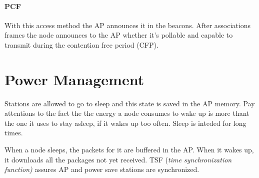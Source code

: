 \paragraph*{PCF} With this access method the AP announces it in the beacons.
After associations frames the node announces to the AP whether it's pollable
and capable to transmit during the contention free period (CFP).

\section{Power Management}
Stations are allowed to go to sleep and this state is saved in the AP memory. Pay attentions to the fact the the energy a node consumes to wake up is more thant the one it uses to stay asleep, if it wakes up too often. Sleep is inteded for long times.

When a node sleeps, the packets for it are buffered in the AP. When it wakes up, it downloads all the packages not yet received. TSF (\textit{time synchronization function)} assures AP and power save stations are synchronized.

